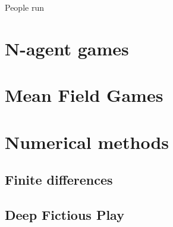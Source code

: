 People run
\section{N-agent games}
\section{Mean Field Games}
\section{Numerical methods}
\subsection{Finite differences}
\subsection{Deep Fictious Play}